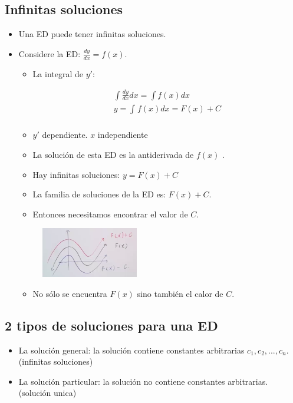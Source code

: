 \subsection{Infinitas soluciones}
\begin{itemize}
    \item Una ED puede tener infinitas soluciones.
    \item Considere la ED: $\displaystyle \frac{d y}{d x} = f(x)$.
        \begin{itemize}
            \item La integral de $y'$: 
                \begin{center}
                   \begin{align*}
                        \int \frac{d y}{d x} dx = \int f(x) dx \\ 
                        y = \int_{}^{}f(x) dx = F(x) + C \\ 
                   \end{align*}
                \end{center}
            \item $y'$ dependiente. $x$ independiente
            \item La solución de esta ED es la antiderivada de $f(x)$ .
            \item Hay infinitas soluciones: $y = F(x) + C$ 
            \item La familia de soluciones de la ED es: $F(x)+C$.
            \item Entonces necesitamos encontrar el valor de $C$.
        \end{itemize}
        \begin{figure}[H]
            \centering
            \includegraphics[width=0.4\textwidth]{./Figs/2021-01-11-10-50-53.png}
        \end{figure}
        \begin{itemize}
            \item No sólo se encuentra $F(x)$ sino también el calor de $C$.
        \end{itemize}
\end{itemize}

\subsection{2 tipos de soluciones para una ED}
\begin{itemize}
    \item La solución general: la solución contiene constantes arbitrarias $c_1,c_2,...,c_n$. (infinitas soluciones)
    \item La solución particular: la solución no contiene constantes arbitrarias. (solución unica)
\end{itemize}

